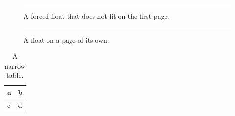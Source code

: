 \documentclass[11pt]{article}
\begin{document}
\lipsum[1-2]
\begin{figure}[H]
  \centering
  \rule{0.9\textwidth}{0.6\textheight}
  \caption{A forced float that does not fit on the first page.}
\end{figure}
\lipsum[5]
\clearpage
\begin{figure}[p]
  \centering
  \rule{0.95\textwidth}{0.3\textheight}
  \caption{A float on a page of its own.}
\end{figure}
\begin{table}[p]
  \centering
  \caption{A narrow table.}
  \begin{tabular}{ll}
    \hline
    a & b \\
    \hline
    c & d \\
    \hline
  \end{tabular}
\end{table}
\clearpage
\lipsum[6]
\end{document}
